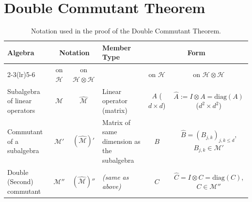 \newpage

\section{Double Commutant Theorem}

\begin{table}[h!]
\centering
\renewcommand{\arraystretch}{1.3}
\begin{tabular}{@{}p{3cm}ccp{3.2cm}cc@{}}
\toprule
\textbf{Algebra} 
& \multicolumn{2}{c}{\textbf{Notation}} 
& \textbf{Member Type} 
& \multicolumn{2}{c}{\textbf{Form}} \\

\cmidrule(lr){2-3}\cmidrule(lr){5-6}
& on $\mathcal{H}$ & on $\mathcal{H} \otimes \mathcal{H}$ 
& & on $\mathcal{H}$ & on $\mathcal{H} \otimes \mathcal{H}$ \\
\midrule

Subalgebra of linear operators 
& $\mathcal{M}$ 
& $\widehat{\mathcal{M}}$ 
& Linear operator (matrix) 
& $A$ ($d\times d$) 
& $\widehat{A} := I \otimes A = \text{diag}(A)$ ($d^2\times d^2$) \\

Commutant of a subalgebra 
& $\mathcal{M}'$ 
& $(\widehat{\mathcal{M}})'$ 
& Matrix of same dimension as the subalgebra 
& $B$ 
& $\widehat{B} = (B_{j,k})_{j,k\le d}$, $B_{j,k}\in \mathcal{M}'$ \\

Double (Second) commutant 
& $\mathcal{M}''$ 
& $(\widehat{\mathcal{M}})''$ 
& \textit{(same as above)} 
& $C$ 
& $\widehat{C} = I \otimes C = \mathrm{diag}(C)$, $C\in\mathcal{M}''$ \\
\bottomrule
\end{tabular}
\caption{Notation used in the proof of the Double Commutant Theorem.}
\label{tab:notation-commutator-proof}
\end{table}


        
